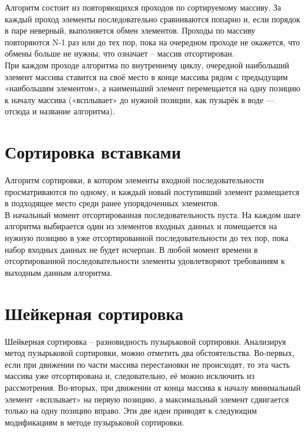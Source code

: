 \documentclass[12pt,a4paper]{report}
\begin{document}
Алгоритм состоит из повторяющихся проходов по сортируемому массиву. 
За каждый проход элементы последовательно сравниваются попарно и, если порядок в паре неверный, выполняется обмен элементов. 
Проходы по массиву повторяются N-1 раз или до тех пор, пока на очередном проходе не окажется, что обмены больше не нужны, что 
означает -- массив отсортирован. \\

При каждом проходе алгоритма по внутреннему циклу, очередной наибольший элемент массива ставится на своё место в конце массива 
рядом с предыдущим «наибольшим элементом», а наименьший элемент перемещается на одну позицию к началу массива («всплывает» до 
нужной позиции, как пузырёк в воде — отсюда и название алгоритма). \\

\section{Сортировка вставками}

Алгоритм сортировки, в котором элементы входной последовательности просматриваются по одному, и каждый новый поступивший 
элемент размещается в подходящее место среди ранее упорядоченных элементов. \cite{analyse2_info} \\

В начальный момент отсортированная последовательность пуста. 
На каждом шаге алгоритма выбирается один из элементов входных данных и помещается на нужную позицию в уже отсортированной 
последовательности до тех пор, пока набор входных данных не будет исчерпан. 
В любой момент времени в отсортированной последовательности элементы удовлетворяют требованиям к выходным данным алгоритма. \\

\section{Шейкерная сортировка}

Шейкерная сортировка -- разновидность пузырьковой сортировки. \cite{analyse1_info}
Анализируя метод пузырьковой сортировки, можно отметить два обстоятельства.
Во-первых, если при движении по части массива перестановки не происходят, то эта часть массива уже отсортирована и, следовательно, 
её можно исключить из рассмотрения.
Во-вторых, при движении от конца массива к началу минимальный элемент «всплывает» на первую позицию, а максимальный элемент 
сдвигается только на одну позицию вправо.
Эти две идеи приводят к следующим модификациям в методе пузырьковой сортировки. \\
\end{document}
